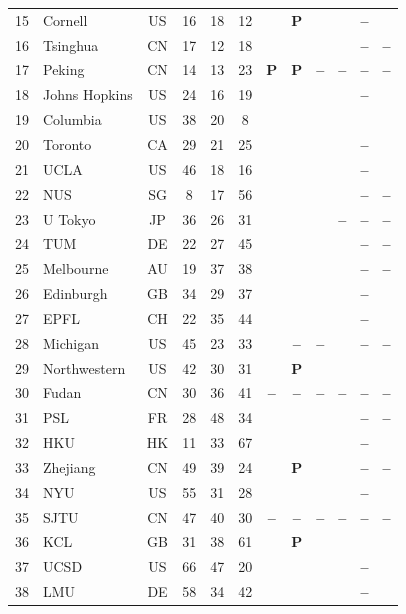 \documentclass[pdflatex,sn-basic,Numbered]{sn-jnl}
\newcommand{\si}{\ding{51}}
\newcommand{\no}{\textcolor{gris}{\textbf{--}}}
\newcommand{\pc}{\textbf{P}}
\theoremstyle{thmstyleone}
\theoremstyle{thmstyletwo}
\theoremstyle{thmstylethree}
\begin{document}
\begin{appendices}
\begin{longtable}{@{}r l c c c c c c c c c c@{}}
	15 & Cornell & US & 16 & 18 & 12 & \si & \pc & \si & \si & \no & \si \\
	16 & Tsinghua & CN & 17 & 12 & 18 & \si & \si & \si & \si & \no & \no \\
	17 & Peking & CN & 14 & 13 & 23 & \pc & \pc & \no & \no & \no & \no \\
	18 & Johns Hopkins & US & 24 & 16 & 19 & \si & \si & \si & \si & \no & \si \\
	19 & Columbia & US & 38 & 20 & 8 & \si & \si & \si & \si & \si & \si \\
	20 & Toronto & CA & 29 & 21 & 25 & \si & \si & \si & \si & \no & \si \\
	21 & UCLA & US & 46 & 18 & 16 & \si & \si & \si & \si & \no & \si \\
	22 & NUS & SG & 8 & 17 & 56 & \si & \si & \si & \si & \no & \no \\
	23 & U Tokyo & JP & 36 & 26 & 31 & \si & \si & \si & \no & \no & \no \\
	24 & TUM & DE & 22 & 27 & 45 & \si & \si & \si & \si & \no & \no \\
	25 & Melbourne & AU & 19 & 37 & 38 & \si & \si & \si & \si & \no & \no \\
	26 & Edinburgh & GB & 34 & 29 & 37 & \si & \si & \si & \si & \no & \si \\
	27 & EPFL & CH & 22 & 35 & 44 & \si & \si & \si & \si & \no & \si \\
	28 & Michigan & US & 45 & 23 & 33 & \si & \no & \no & \si & \no & \no \\
	29 & Northwestern & US & 42 & 30 & 31 & \si & \pc & \si & \si & \si & \si \\
	30 & Fudan & CN & 30 & 36 & 41 & \no & \no & \no & \no & \no & \no \\
	31 & PSL & FR & 28 & 48 & 34 & \si & \si & \si & \si & \no & \no \\
	32 & HKU & HK & 11 & 33 & 67 & \si & \si & \si & \si & \no & \si \\
	33 & Zhejiang & CN & 49 & 39 & 24 & \si & \pc & \si & \si & \no & \no \\
	34 & NYU & US & 55 & 31 & 28 & \si & \si & \si & \si & \no & \si \\
	35 & SJTU & CN & 47 & 40 & 30 & \no & \no & \no & \no & \no & \no \\
	36 & KCL & GB & 31 & 38 & 61 & \si & \pc & \si & \si & \si & \si \\
	37 & UCSD & US & 66 & 47 & 20 & \si & \si & \si & \si & \no & \si \\
	38 & LMU & DE & 58 & 34 & 42 & \si & \si & \si & \si & \no & \si \\

\end{longtable}
\end{appendices}
\end{document}

